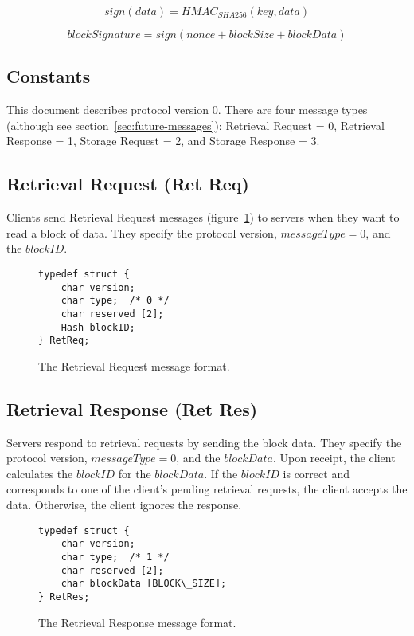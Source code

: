\documentclass[letterpaper,9pt,twocolumn]{article}
\begin{document}
\begin{equation}
sign(data) = HMAC_{SHA256}(key, data)
\label{eqn:sign}
\end{equation}

\begin{equation}
blockSignature = sign(nonce + blockSize + blockData)
\label{eqn:block-signature}
\end{equation}

\subsection{Constants}

This document describes protocol version 0. There are four message types
(although see section~\ref{sec:future-messages}): Retrieval Request = 0,
Retrieval Response = 1, Storage Request = 2, and Storage Response = 3.


\subsection{Retrieval Request (Ret Req)}
\label{sec:RetReq}

Clients send Retrieval Request messages (figure~\ref{fig:RetReq}) to servers
when they want to read a block of data. They specify the protocol version,
$messageType = 0$, and the $blockID$.

\begin{figure}[t]
{\small \begin{verbatim}
typedef struct {
    char version;
    char type;  /* 0 */
    char reserved [2];
    Hash blockID;
} RetReq;
\end{verbatim} }
\caption{The Retrieval Request message format.}
\label{fig:RetReq}
\end{figure}

\subsection{Retrieval Response (Ret Res)}
\label{sec:RetRes}

Servers respond to retrieval requests by sending the block data. They
specify the protocol version, $messageType = 0$, and the $blockData$. Upon
receipt, the client calculates the $blockID$ for the $blockData$. If the
$blockID$ is correct and corresponds to one of the client's pending
retrieval requests, the client accepts the data. Otherwise, the client
ignores the response.

\begin{figure}[t]
{\small \begin{verbatim}
typedef struct {
    char version;
    char type;  /* 1 */
    char reserved [2];
    char blockData [BLOCK\_SIZE];
} RetRes;
\end{verbatim} }
\caption{The Retrieval Response message format.}
\label{fig:RetRes}
\end{figure}
\end{document}
